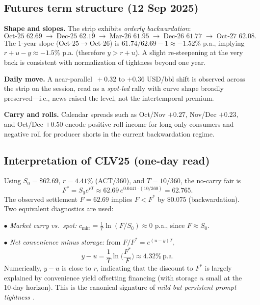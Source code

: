\documentclass[11pt,a4paper]{article} %
\begin{document}
\subsection{Futures term structure (12 Sep 2025)}
\textbf{Shape and slopes.} The strip exhibits \emph{orderly backwardation}:
\[
\text{Oct-25 } \mathbf{62.69} \;\rightarrow\; \text{Dec-25 } \mathbf{62.19}
\;\rightarrow\; \text{Mar-26 } \mathbf{61.95}
\;\rightarrow\; \text{Dec-26 } \mathbf{61.77}
\;\rightarrow\; \text{Oct-27 } \mathbf{62.08}.
\]
The 1-year slope (Oct-25\(\to\)Oct-26) is \(61.74/62.69-1\approx \mathbf{-1.52\%}\) p.a., implying \(r+u-y\approx -1.5\%\) p.a. (therefore \(y>r+u\)). A slight re-steepening at the very back is consistent with normalization of tightness beyond one year.

\textbf{Daily move.} A near-parallel \(\,+0.32\) to \(+0.36\) USD/bbl shift is observed across the strip on the session, read as a \emph{spot-led} rally with curve shape broadly preserved—i.e., news raised the level, not the intertemporal premium.

\textbf{Carry and rolls.} Calendar spreads such as Oct/Nov \(+0.27\), Nov/Dec \(+0.23\), and Oct/Dec \(+0.50\) encode positive roll income for long-only consumers and negative roll for producer shorts in the current backwardation regime.

\subsection{Interpretation of \texorpdfstring{CLV25}{CLV25} (one-day read)}
Using \(S_0=\$62.69\), \(r=4.41\%\) (ACT/360), and \(T=10/360\), the no-carry fair is
\[
F^{*}=S_0 e^{rT} \approx 62.69\,e^{0.0441\cdot(10/360)}=\mathbf{62.765}.
\]
The observed settlement \(F=\mathbf{62.69}\) implies \(F<F^{*}\) by \(\$0.075\) (backwardation). Two equivalent diagnostics are used:

\(\bullet\) \emph{Market carry vs.\ spot:} \(c_{\text{mkt}}=\frac{1}{T}\ln(F/S_0)\approx 0\) p.a., since \(F\approx S_0\).

\(\bullet\) \emph{Net convenience minus storage:} from \(F/F^{*}=e^{(u-y)T}\),
\[
y-u=\frac{1}{T}\ln\!\Big(\frac{F^{*}}{F}\Big)\approx \mathbf{4.32\%}\ \text{p.a.}
\]
Numerically, \(y-u\) is close to \(r\), indicating that the discount to \(F^{*}\) is largely explained by convenience yield offsetting financing (with storage \(u\) small at the 10-day horizon). This is the canonical signature of \emph{mild but persistent prompt tightness} \citep{eia_backwardation_2013,milonas_convenience_2024}.
\end{document}
